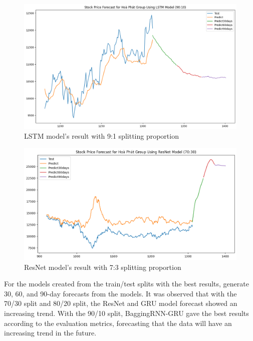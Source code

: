 \documentclass{ieeeojies}
\begin{document}
\begin{figure}[H]
  \centering
  \begin{minipage}{0.8\linewidth}
    \centering
    \includegraphics[width=\linewidth]{bibliography/LSTM_HPG_90-10.png}
    \caption{LSTM model's result with 9:1 splitting proportion}
    \label{fig14}
  \end{minipage}
\end{figure}
\begin{figure}[H]
  \centering
  \begin{minipage}{0.8\linewidth}
    \centering    \includegraphics[width=\linewidth]{bibliography/ResNet_HPG_70-30.png}
    \caption{ResNet model's result with 7:3 splitting proportion}
    \label{bagginggru}
  \end{minipage}
\end{figure}
For the models created from the train/test splits with the best results, generate 30, 60, and 90-day forecasts from the models. It was observed that with the 70/30 split and 80/20 split, the ResNet and GRU model forecast showed an increasing trend. With the 90/10 split, BaggingRNN-GRU gave the best results according to the evaluation metrics, forecasting that the data will have an increasing trend in the future.
\end{document}
